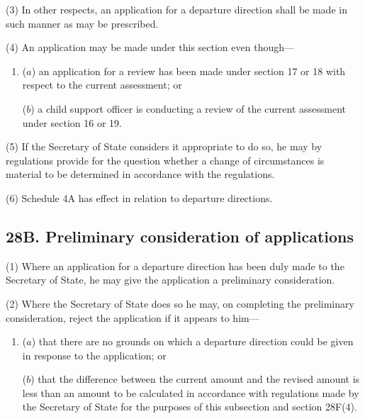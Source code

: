 \documentclass[12pt,a4paper]{article}
\begin{document}
(3) In other respects, an application for a departure direction shall be made in such manner as may be prescribed.

(4) An application may be made under this section even though—
\begin{enumerate}\item[]
($a$) an application for a review has been made under section 17 or 18 with respect to the current assessment; or

($b$) a child support officer is conducting a review of the current assessment under section 16 or 19.
\end{enumerate}


(5) If the Secretary of State considers it appropriate to do so, he may by regulations provide for the question whether a change of circumstances is material to be determined in accordance with the regulations.

(6) Schedule 4A has effect in relation to departure directions.


\subsection{28B. Preliminary consideration of applications}

(1) Where an application for a departure direction has been duly made to the Secretary of State, he may give the application a preliminary consideration.

(2) Where the Secretary of State does so he may, on completing the preliminary consideration, reject the application if it appears to him—
\begin{enumerate}\item[]
($a$) that there are no grounds on which a departure direction could be given in response to the application; or

($b$) that the difference between the current amount and the revised amount is less than an amount to be calculated in accordance with regulations made by the Secretary of State for the purposes of this subsection and section 28F(4).
\end{enumerate}
\end{document}

